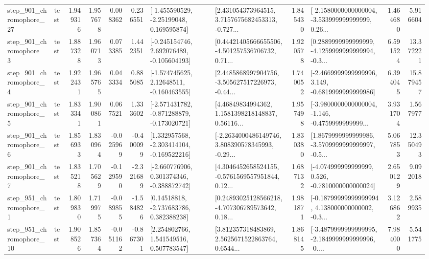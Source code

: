 \begin{tabular}{llrrrrllrlrr}
  step\_901\_chromophore\_27 &      test &      1.949316 &    1.957678 &      0.008362 &  0.236551 &    [-1.455590529, -2.25199048, 0.169595874] &  [2.431054373964515, 3.7157675682453313, -0.727... &       1.845430 &  [-2.1580000000000004, -3.533999999999999, 0.26... &            1.464680 &          5.916604 \\
   step\_901\_chromophore\_3 &      test &      1.887328 &    1.960713 &      0.073385 &  1.442351 &   [-0.245154746, 2.692076489, -0.105604193] &  [0.44421405666655506, -4.501257536706732, 0.71... &       1.920578 &  [0.2889999999999999, -4.1259999999999994, -0.3... &            6.591524 &         13.372221 \\
   step\_901\_chromophore\_4 &      test &      1.922431 &    1.965765 &      0.043334 &  0.885085 &    [-1.574745625, 2.12648511, -0.160463555] &  [2.4485868997904756, -3.505627517226973, -0.44... &       1.740052 &  [-2.4669999999999996, 3.149, -0.6819999999999986] &            6.394045 &         15.879457 \\
   step\_901\_chromophore\_5 &      test &      1.833341 &    1.900861 &      0.067521 &  1.333602 &  [-2.571431782, -0.871288879, -0.173020721] &  [4.46849834994362, 1.1581398218148837, 0.56116... &       1.957498 &  [-3.9800000000000004, -1.146, -0.4759999999999... &            3.931704 &          1.567977 \\
   step\_901\_chromophore\_6 &      test &      1.856933 &    1.830964 &     -0.025969 & -0.400099 &   [1.332957568, -2.303414104, -0.169522216] &  [-2.2634000486149746, 3.808390578345993, -0.29... &       1.830380 &  [1.8679999999999986, -3.5709999999999997, -0.5... &            5.067853 &         12.350493 \\
   step\_901\_chromophore\_7 &      test &      1.835218 &    1.705629 &     -0.129590 & -2.321689 &   [-2.660776906, 0.301374346, -0.388872742] &  [4.3046452658524155, -0.5761569557951844, 0.12... &       1.687132 &   [-4.074999999999999, 0.526, -0.7810000000000024] &            2.650129 &          9.092018 \\
   step\_951\_chromophore\_1 &      test &      1.809830 &    1.719975 &     -0.089855 & -1.584826 &     [0.14518818, -2.737683786, 0.382388238] &  [0.24893025128566218, -4.707306789573642, 0.18... &       1.981871 &  [-0.18799999999999994, 4.138000000000002, -0.3... &            3.126862 &          2.589935 \\
  step\_951\_chromophore\_10 &      test &      1.908526 &    1.857364 &     -0.051162 & -0.867301 &     [2.254802766, 1.541549516, 0.507783547] &  [3.812357318483869, 2.5625671522863764, 0.6544... &       1.868145 &  [-3.4879999999999995, -2.1849999999999996, -0.... &            7.984000 &          5.541775 \\

\end{tabular}
